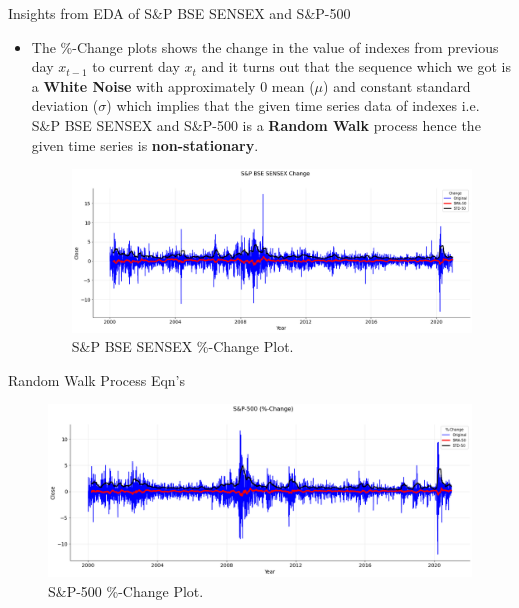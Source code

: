\documentclass{beamer}
\begin{document}
\begin{frame}{Insights from EDA of S\&P BSE SENSEX and S\&P-500}
	\begin{itemize}
		\item The \%-Change plots shows the change in the value of indexes from previous day $x_{t - 1}$ to current day $x_{t}$ and it turns out that the sequence which we got is a \textbf{White Noise} with approximately $0$ mean ($\mu$) and constant standard deviation ($\sigma$) which implies that the given time series data of indexes i.e. S\&P BSE SENSEX and S\&P-500 is a \textbf{Random Walk} process hence the given time series is \textbf{non-stationary}.
		      \pause
		      \begin{figure}
		      	\centering
		      	\includegraphics[width = 0.90 \linewidth]{BSE SENSEX White Noise Part}
		      	\caption{S\&P BSE SENSEX \%-Change Plot.}
		      \end{figure}
	\end{itemize}
\end{frame}

\begin{frame}{Random Walk Process Eqn's}
	\begin{figure}
		\centering
		\includegraphics[width = 0.90 \linewidth]{S&P-500 White Noise Part.png}
		\caption{S\&P-500 \%-Change Plot.}
	\end{figure}
\end{frame}
\end{document}
